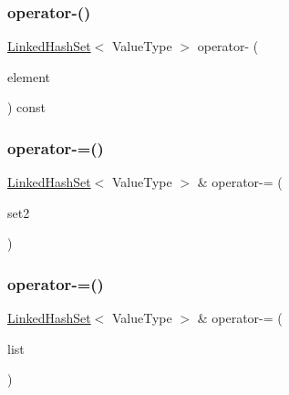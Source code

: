 \mbox{\label{classLinkedHashSet_ad77b819e03e68919da1cc4bfd07e03cb}} 
\subsubsection{\texorpdfstring{operator-\/()}{operator-()}\hspace{0.1cm}{\footnotesize\ttfamily [3/3]}}
{\footnotesize\ttfamily \mbox{\hyperlink{classLinkedHashSet}{Linked\+Hash\+Set}}$<$ Value\+Type $>$ operator-\/ (\begin{DoxyParamCaption}\item[{const Value\+Type \&}]{element }\end{DoxyParamCaption}) const}

\mbox{\label{classLinkedHashSet_ab333bffc9ab2376c97bb07237b1e4364}} 
\subsubsection{\texorpdfstring{operator-\/=()}{operator-=()}\hspace{0.1cm}{\footnotesize\ttfamily [1/3]}}
{\footnotesize\ttfamily \mbox{\hyperlink{classLinkedHashSet}{Linked\+Hash\+Set}}$<$ Value\+Type $>$ \& operator-\/= (\begin{DoxyParamCaption}\item[{const \mbox{\hyperlink{classLinkedHashSet}{Linked\+Hash\+Set}}$<$ Value\+Type $>$ \&}]{set2 }\end{DoxyParamCaption})}

\mbox{\label{classLinkedHashSet_aa27efe1a96a2f55dde4c8c2fa020119e}} 
\subsubsection{\texorpdfstring{operator-\/=()}{operator-=()}\hspace{0.1cm}{\footnotesize\ttfamily [2/3]}}
{\footnotesize\ttfamily \mbox{\hyperlink{classLinkedHashSet}{Linked\+Hash\+Set}}$<$ Value\+Type $>$ \& operator-\/= (\begin{DoxyParamCaption}\item[{std\+::initializer\+\_\+list$<$ Value\+Type $>$}]{list }\end{DoxyParamCaption})}

